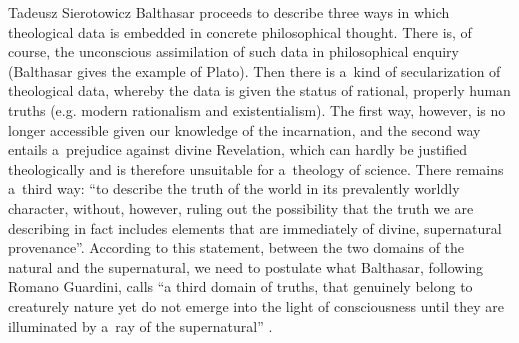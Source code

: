 \begin{artengenv}{Tadeusz Sierotowicz}
Balthasar proceeds to describe three ways in which theological data is embedded in concrete philosophical thought. There is, of course, the unconscious assimilation of such data in philosophical enquiry (Balthasar gives the example of Plato). Then there is a~kind of secularization of theological data, whereby the data is given the status of rational, properly human truths (e.g. modern rationalism and existentialism). The first way, however, is no longer accessible given our knowledge of the incarnation, and the second way entails a~prejudice against divine Revelation, which can hardly be justified theologically and is therefore unsuitable for a~theology of science. There remains a~third way: ``to describe the truth of the world in its prevalently worldly character, without, however, ruling out the possibility that the truth we are describing in fact includes elements that are immediately of divine, supernatural provenance''. According to this statement, between the two domains of the natural and the supernatural, we need to postulate what Balthasar, following Romano Guardini, calls ``a third domain of truths, that genuinely belong to creaturely nature yet do not emerge into the light of consciousness until they are illuminated by a~ray of the supernatural'' 
\parencite[][p.12]{balthasar_theo-logic_2000}.%





\end{artengenv}

